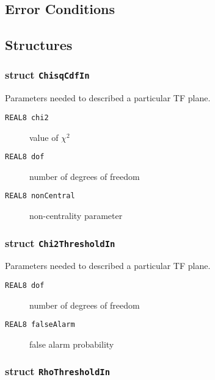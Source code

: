 \subsection*{Error Conditions}


\subsection*{Structures}

\subsubsection*{struct \texttt{ChisqCdfIn}}

\noindent Parameters needed to described a particular TF plane.

\begin{description}
\item[\texttt{REAL8     chi2}] value of $\chi^2$
\item[\texttt{REAL8     dof}]  number of degrees of freedom
\item[\texttt{REAL8     nonCentral}]  non-centrality parameter
\end{description}

\subsubsection*{struct \texttt{Chi2ThresholdIn}}

\noindent Parameters needed to described a particular TF plane.

\begin{description}
\item[\texttt{REAL8     dof}]   number of degrees of freedom 
\item[\texttt{REAL8     falseAlarm}]  false alarm probability 
\end{description}

\subsubsection*{struct \texttt{RhoThresholdIn}}

